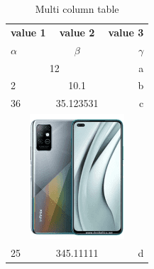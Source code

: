 \documentclass{article}
\begin{document}
	\begin{table}[h!]
		\begin{center}
			\caption{Multi column table}
			\label{tab:table1}
			\begin{tabular}{|l|c|r|}
				\hline
				\textbf{value 1} & \textbf{value 2} & \textbf{value 3} \\
				$\alpha$ & $\beta$ & $\gamma$\\
				\hline
				\multicolumn{2}{|c|}{12} & a\\
				\hline
				2 & 10.1 & b\\
				\hline
				36 & 35.123531 & c \\
				\hline
				\multicolumn{3}{|c|}{\includegraphics[width=0.15\linewidth]{phone.png}}\\
				\hline
				25 & 345.11111 & d\\
				\hline
			\end{tabular}
		\end{center}
	\end{table}
\end{document}

